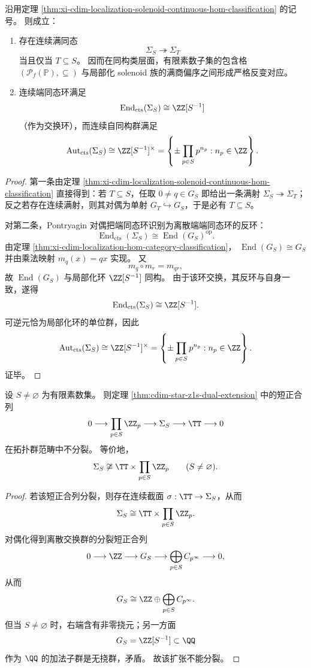 \begin{corollary}\label{cor:xi-cdim-localization-solenoid-quotient-order-endomorphism}
沿用定理 \ref{thm:xi-cdim-localization-solenoid-continuous-hom-classification} 的记号。
则成立：
\begin{enumerate}
  \item 存在连续满同态
  \[
  \Sigma_S\twoheadrightarrow \Sigma_T
  \]
  当且仅当 \(T\subseteq S\)。
  因而在同构类层面，有限素数子集的包含格
  \(
  (\mathcal P_f(\mathbb P),\subseteq)
  \)
  与局部化 solenoid 族的满商偏序之间形成严格反变对应。
  \item 连续端同态环满足
  \[
  \operatorname{End}_{\mathrm{cts}}(\Sigma_S)\cong \ZZ[S^{-1}]
  \]
  （作为交换环），而连续自同构群满足
  \[
  \operatorname{Aut}_{\mathrm{cts}}(\Sigma_S)
  \cong
  \ZZ[S^{-1}]^\times
  =
  \left\{\pm\prod_{p\in S}p^{n_p}: n_p\in\ZZ\right\}.
  \]
\end{enumerate}
\end{corollary}
\begin{proof}
第一条由定理 \ref{thm:xi-cdim-localization-solenoid-continuous-hom-classification} 直接得到：若 \(T\subseteq S\)，任取 \(0\neq q\in G_S\) 即给出一条满射 \(\Sigma_S\twoheadrightarrow \Sigma_T\)；反之若存在连续满射，则其对偶为单射
\(
G_T\hookrightarrow G_S
\)，于是必有 \(T\subseteq S\)。

对第二条，Pontryagin 对偶把端同态环识别为离散端端同态环的反环：
\[
\operatorname{End}_{\mathrm{cts}}(\Sigma_S)\cong \operatorname{End}(G_S)^{\mathrm{op}}.
\]
由定理 \ref{thm:xi-cdim-localization-hom-category-classification}，
\(
\operatorname{End}(G_S)\cong G_S
\)
并由乘法映射 \(m_q(x)=qx\) 实现。
又
\[
m_q\circ m_r=m_{qr},
\]
故 \(\operatorname{End}(G_S)\) 与局部化环 \(\ZZ[S^{-1}]\) 同构。
由于该环交换，其反环与自身一致，遂得
\[
\operatorname{End}_{\mathrm{cts}}(\Sigma_S)\cong \ZZ[S^{-1}].
\]
可逆元恰为局部化环的单位群，因此
\[
\operatorname{Aut}_{\mathrm{cts}}(\Sigma_S)\cong \ZZ[S^{-1}]^\times
=
\left\{\pm\prod_{p\in S}p^{n_p}: n_p\in\ZZ\right\}.
\]
证毕。
\end{proof}

\begin{theorem}\label{thm:xi-cdim-localization-solenoid-circle-extension-nonsplit}
设 \(S\neq\varnothing\) 为有限素数集。
则定理 \ref{thm:cdim-star-z1s-dual-extension} 中的短正合列
\[
0\longrightarrow \prod_{p\in S}\ZZ_p
\longrightarrow \Sigma_S
\longrightarrow \TT
\longrightarrow 0
\]
在拓扑群范畴中不分裂。
等价地，
\[
\Sigma_S\not\cong \TT\times \prod_{p\in S}\ZZ_p
\qquad (S\neq\varnothing).
\]
\end{theorem}
\begin{proof}
若该短正合列分裂，则存在连续截面 \(\sigma:\TT\to\Sigma_S\)，从而
\[
\Sigma_S\cong \TT\times \prod_{p\in S}\ZZ_p.
\]
对偶化得到离散交换群的分裂短正合列
\[
0\longrightarrow \ZZ
\longrightarrow G_S
\longrightarrow \bigoplus_{p\in S}C_{p^\infty}
\longrightarrow 0,
\]
从而
\[
G_S\cong \ZZ\oplus \bigoplus_{p\in S}C_{p^\infty}.
\]
但当 \(S\neq\varnothing\) 时，右端含有非零挠元；另一方面
\[
G_S=\ZZ[S^{-1}]\subset \QQ
\]
作为 \(\QQ\) 的加法子群是无挠群，矛盾。
故该扩张不能分裂。
\end{proof}

\endinput

